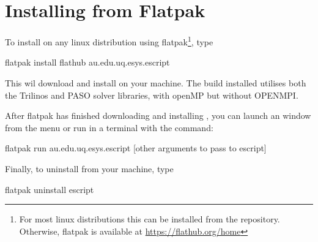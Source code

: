 %
%
%


\chapter{Installing from Flatpak}\label{chap:flatpak}

To install \escript on any linux distribution using flatpak\footnote{For most linux distributions this can be installed from the repository. Otherwise, flatpak is available at \url{https://flathub.org/home}}, type
\begin{shellCode}
flatpak install flathub au.edu.uq.esys.escript
\end{shellCode}

This wil download and install \escript on your machine. The \escript build installed utilises both the Trilinos and PASO solver libraries, with openMP but without OPENMPI. 

After flatpak has finished downloading and installing \escript, you can launch an \escript window from the menu or run \escript in a terminal with the command:
\begin{shellCode}
flatpak run au.edu.uq.esys.escript [other arguments to pass to escript]
\end{shellCode}

Finally, to uninstall \escript from your machine, type
\begin{shellCode}
flatpak uninstall escript
\end{shellCode}
